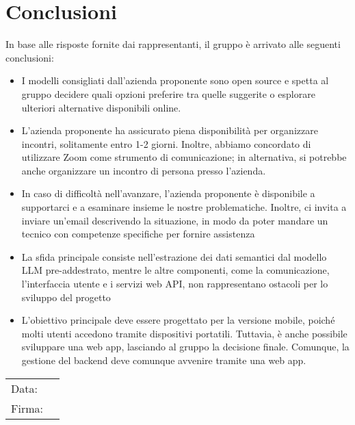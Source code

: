 \documentclass[a4paper, 12pt]{article}
\begin{document}
\section{Conclusioni}
In base alle risposte fornite dai rappresentanti, il gruppo è arrivato alle seguenti conclusioni:
\begin{itemize}
    \item I modelli consigliati dall’azienda proponente sono open source e spetta al gruppo decidere quali opzioni preferire tra quelle suggerite o esplorare ulteriori alternative disponibili online.
    
    \item L’azienda proponente ha assicurato piena disponibilità per organizzare incontri, solitamente entro 1-2 giorni. Inoltre, abbiamo concordato di utilizzare Zoom come strumento di comunicazione; in alternativa, si potrebbe anche organizzare un incontro di persona presso l’azienda.
    
    \item In caso di difficoltà nell'avanzare, l'azienda proponente è disponibile a supportarci e a esaminare insieme le nostre problematiche. Inoltre, ci invita a inviare un’email descrivendo la situazione, in modo da poter mandare un tecnico con competenze specifiche per fornire assistenza
    
    \item La sfida principale consiste nell'estrazione dei dati semantici dal modello LLM pre-addestrato, mentre le altre componenti, come la comunicazione, l'interfaccia utente e i servizi web API, non rappresentano ostacoli per lo sviluppo del progetto

    \item L’obiettivo principale deve essere progettato per la versione mobile, poiché molti utenti accedono tramite dispositivi portatili. Tuttavia, è anche possibile sviluppare una web app, lasciando al gruppo la decisione finale. Comunque, la gestione del backend deve comunque avvenire tramite una web app.
\end{itemize}

\vfill
{\renewcommand{\arraystretch}{2}
\begin{tabular}{l p{5cm}}
    Data: &  \hrulefill \\
    Firma: & \hrulefill \\
\end{tabular}
}
\end{document}
